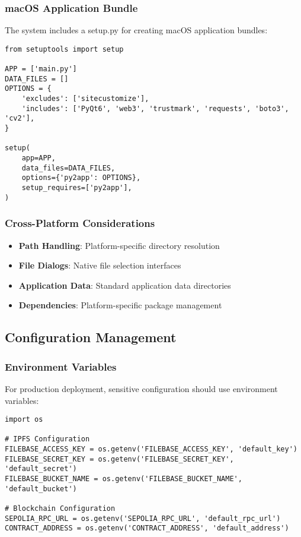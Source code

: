 \documentclass[12pt,a4paper]{article}
\begin{document}
\subsubsection{macOS Application Bundle}
The system includes a setup.py for creating macOS application bundles:

\begin{lstlisting}[caption=macOS Packaging Configuration]
from setuptools import setup

APP = ['main.py']
DATA_FILES = []
OPTIONS = {
    'excludes': ['sitecustomize'],
    'includes': ['PyQt6', 'web3', 'trustmark', 'requests', 'boto3', 'cv2'],
}

setup(
    app=APP,
    data_files=DATA_FILES,
    options={'py2app': OPTIONS},
    setup_requires=['py2app'],
)
\end{lstlisting}

\subsubsection{Cross-Platform Considerations}
\begin{itemize}
    \item \textbf{Path Handling}: Platform-specific directory resolution
    \item \textbf{File Dialogs}: Native file selection interfaces
    \item \textbf{Application Data}: Standard application data directories
    \item \textbf{Dependencies}: Platform-specific package management
\end{itemize}

\subsection{Configuration Management}

\subsubsection{Environment Variables}
For production deployment, sensitive configuration should use environment variables:

\begin{lstlisting}[caption=Environment Variable Configuration]
import os

# IPFS Configuration
FILEBASE_ACCESS_KEY = os.getenv('FILEBASE_ACCESS_KEY', 'default_key')
FILEBASE_SECRET_KEY = os.getenv('FILEBASE_SECRET_KEY', 'default_secret')
FILEBASE_BUCKET_NAME = os.getenv('FILEBASE_BUCKET_NAME', 'default_bucket')

# Blockchain Configuration
SEPOLIA_RPC_URL = os.getenv('SEPOLIA_RPC_URL', 'default_rpc_url')
CONTRACT_ADDRESS = os.getenv('CONTRACT_ADDRESS', 'default_address')
\end{lstlisting}
\end{document}
